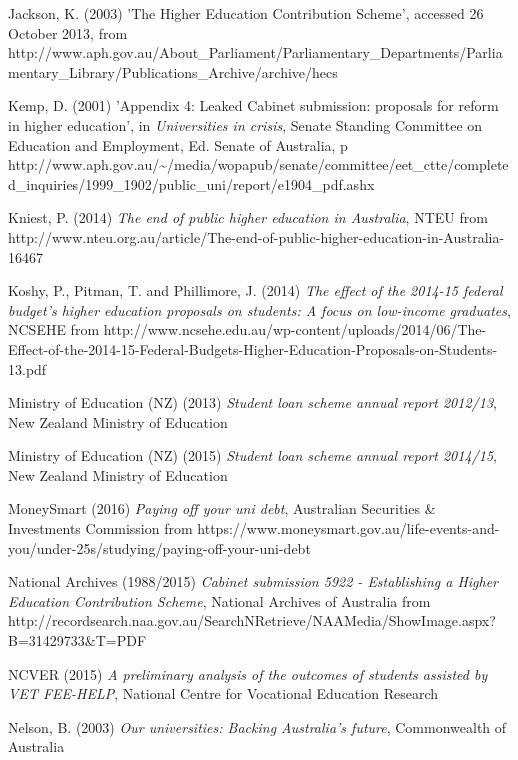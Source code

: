 \documentclass[]{book}
\begin{document}
\protect\hypertarget{_ENREF_50}{}{}Jackson, K. (2003) 'The Higher Education Contribution Scheme', accessed 26 October 2013, from http://www.aph.gov.au/About\_Parliament/Parliamentary\_Departments/Parliamentary\_Library/Publications\_Archive/archive/hecs

\protect\hypertarget{_ENREF_51}{}{}Kemp, D. (2001) 'Appendix 4: Leaked Cabinet submission: proposals for reform in higher education', in \emph{Universities in crisis}, Senate Standing Committee on Education and Employment, Ed. Senate of Australia, p http://www.aph.gov.au/\textasciitilde{}/media/wopapub/senate/committee/eet\_ctte/completed\_inquiries/1999\_1902/public\_uni/report/e1904\_pdf.ashx

\protect\hypertarget{_ENREF_52}{}{}Kniest, P. (2014) \emph{The end of public higher education in Australia}, NTEU from http://www.nteu.org.au/article/The-end-of-public-higher-education-in-Australia-16467

\protect\hypertarget{_ENREF_53}{}{}Koshy, P., Pitman, T. and Phillimore, J. (2014) \emph{The effect of the 2014-15 federal budget's higher education proposals on students: A focus on low-income graduates}, NCSEHE from http://www.ncsehe.edu.au/wp-content/uploads/2014/06/The-Effect-of-the-2014-15-Federal-Budgets-Higher-Education-Proposals-on-Students-13.pdf

\protect\hypertarget{_ENREF_54}{}{}Ministry of Education (NZ) (2013) \emph{Student loan scheme annual report 2012/13}, New Zealand Ministry of Education

\protect\hypertarget{_ENREF_55}{}{}Ministry of Education (NZ) (2015) \emph{Student loan scheme annual report 2014/15}, New Zealand Ministry of Education

\protect\hypertarget{_ENREF_56}{}{}MoneySmart (2016) \emph{Paying off your uni debt}, Australian Securities \& Investments Commission from https://www.moneysmart.gov.au/life-events-and-you/under-25s/studying/paying-off-your-uni-debt

\protect\hypertarget{_ENREF_57}{}{}National Archives (1988/2015) \emph{Cabinet submission 5922 - Establishing a Higher Education Contribution Scheme}, National Archives of Australia from http://recordsearch.naa.gov.au/SearchNRetrieve/NAAMedia/ShowImage.aspx?B=31429733\&T=PDF

\protect\hypertarget{_ENREF_58}{}{}NCVER (2015) \emph{A preliminary analysis of the outcomes of students assisted by VET FEE-HELP}, National Centre for Vocational Education Research

\protect\hypertarget{_ENREF_59}{}{}Nelson, B. (2003) \emph{Our universities: Backing Australia's future}, Commonwealth of Australia
\end{document}
